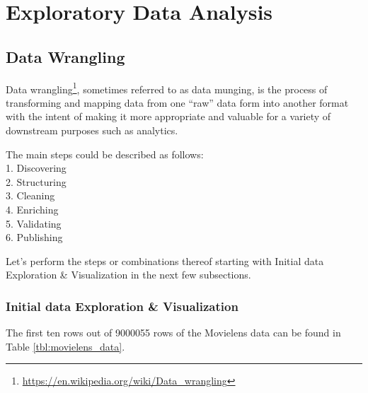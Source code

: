 \documentclass[
]{article}
\DeclareRobustCommand{\href}[2]{#2\footnote{\url{#1}}}
\begin{document}
\newpage

\hypertarget{exploratory-data-analysis}{%
\section{Exploratory Data Analysis}\label{exploratory-data-analysis}}

\hypertarget{data-wrangling}{%
\subsection{Data Wrangling}\label{data-wrangling}}

\href{https://en.wikipedia.org/wiki/Data_wrangling}{Data wrangling},
sometimes referred to as data munging, is the process of transforming
and mapping data from one ``raw'' data form into another format with the
intent of making it more appropriate and valuable for a variety of
downstream purposes such as analytics.

The main steps could be described as follows:\\
1. Discovering\\
2. Structuring\\
3. Cleaning\\
4. Enriching\\
5. Validating\\
6. Publishing

Let's perform the steps or combinations thereof starting with Initial
data Exploration \& Visualization in the next few subsections.

\hypertarget{initial-data-exploration-visualization}{%
\subsubsection{Initial data Exploration \&
Visualization}\label{initial-data-exploration-visualization}}

The first ten rows out of 9000055 rows of the Movielens data can be
found in Table \ref{tbl:movielens_data}.
\end{document}
